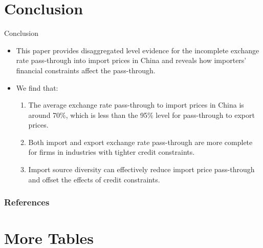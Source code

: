 \documentclass[10pt]{beamer}
\begin{document}
\section{Conclusion}

\begin{frame}{Conclusion}
	\begin{itemize}
		\item This paper provides disaggregated level evidence for the incomplete exchange rate pass-through into import prices in China and reveals how importers’ financial constraints affect the pass-through.
		\item We find that:
		\begin{enumerate}
			\item The average exchange rate pass-through to import prices in China is around 70\%, which is less than the 95\% level for pass-through to export prices.
			\item Both import and export exchange rate pass-through are more complete for firms in industries with tighter credit constraints.
			\item Import source diversity can effectively reduce import price pass-through and offset the effects of credit constraints.
		\end{enumerate}
	\end{itemize}
\end{frame}

\begin{frame}
    \frametitle{References}
    \footnotesize
    
\end{frame}

\appendix
\renewcommand{\thetable}{A.\arabic{table}}
\setcounter{table}{0}

\section*{More Tables}
\end{document}
